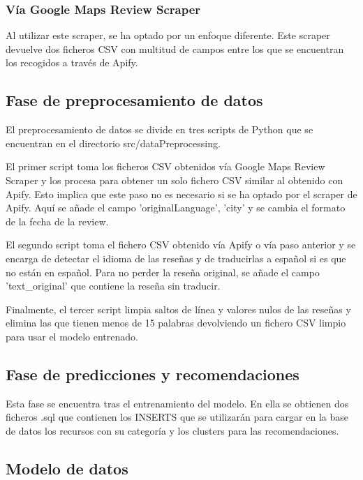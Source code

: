 \subsubsection{Vía Google Maps Review Scraper}

Al utilizar este scraper, se ha optado por un enfoque diferente. Este scraper devuelve dos ficheros CSV con multitud de campos entre los que se encuentran los recogidos a través de Apify.

\subsection{Fase de preprocesamiento de datos}

El preprocesamiento de datos se divide en tres scripts de Python que se encuentran en el directorio src/dataPreprocessing.

El primer script toma los ficheros CSV obtenidos vía Google Maps Review Scraper y los procesa para obtener un solo fichero CSV similar al obtenido con Apify.
Esto implica que este paso no es necesario si se ha optado por el scraper de Apify. Aquí se añade el campo 'originalLanguage', 'city' y se cambia el formato de la fecha de la review.

El segundo script toma el fichero CSV obtenido vía Apify o vía paso anterior y se encarga de detectar el idioma de las reseñas y de traducirlas a español si es que no están en español. 
Para no perder la reseña original, se añade el campo 'text\_original' que contiene la reseña sin traducir.

Finalmente, el tercer script limpia saltos de línea y valores nulos de las reseñas y elimina las que tienen menos de 15 palabras devolviendo un fichero CSV limpio para
usar el modelo entrenado.

\subsection{Fase de predicciones y recomendaciones}

Esta fase se encuentra tras el entrenamiento del modelo. En ella se obtienen dos ficheros .sql que contienen los 
INSERTS que se utilizarán para cargar en la base de datos los recursos con su categoría y los clusters para las recomendaciones.

\subsection{Modelo de datos}

